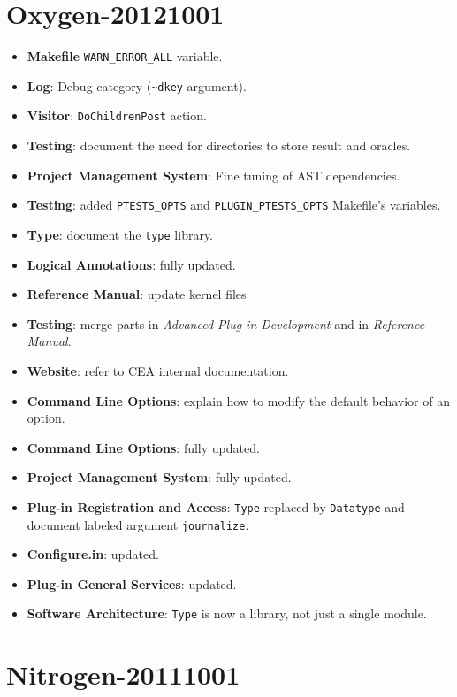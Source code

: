 \section*{Oxygen-20121001}

\begin{itemize}
\item \textbf{Makefile} \texttt{WARN\_ERROR\_ALL} variable.
\item \textbf{Log}: Debug category (\texttt{\~{}dkey} argument).
\item \textbf{Visitor}: \texttt{DoChildrenPost} action.
\item \textbf{Testing}: document the need for directories
  to store result and oracles.
\item \textbf{Project Management System}: Fine tuning of AST dependencies.
\item \textbf{Testing}: added \texttt{PTESTS\_OPTS} and
  \texttt{PLUGIN\_PTESTS\_OPTS} Makefile's variables.
\item \textbf{Type}: document the \texttt{type} library.
\item \textbf{Logical Annotations}: fully updated.
\item \textbf{Reference Manual}: update kernel files.
\item \textbf{Testing}: merge parts in \emph{Advanced Plug-in Development} and
  in \emph{Reference Manual}.
\item \textbf{Website}: refer to CEA internal documentation.
\item \textbf{Command Line Options}: explain how to modify the default behavior
  of an option.
\item \textbf{Command Line Options}: fully updated.
\item \textbf{Project Management System}: fully updated.
\item \textbf{Plug-in Registration and Access}: \texttt{Type} replaced by
  \texttt{Datatype} and document labeled argument \texttt{journalize}.
\item \textbf{Configure.in}: updated.
\item \textbf{Plug-in General Services}: updated.
\item \textbf{Software Architecture}: \texttt{Type} is now a library, not just a
  single module.
\end{itemize}

\section*{Nitrogen-20111001}


